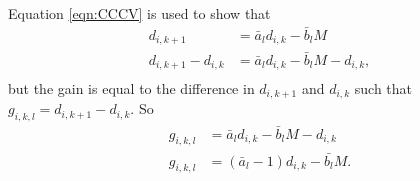 Equation \eqref{eqn:CCCV} is used to show that
\begin{equation}\label{eqn:g}
\begin{aligned}
	d_{i,k+1} &= \bar{a}_ld_{i,k} - \bar{b}_lM \\ 
	d_{i,k+1} - d_{i,k} &= \bar{a}_ld_{i,k} - \bar{b}_lM - d_{i,k},\\
\end{aligned}
\end{equation}
but the gain is equal to the difference in $d_{i,k+1}$ and $d_{i,k}$ such that $g_{i,k,l} = d_{i,k+1} - d_{i,k}$.  So
\begin{equation}\label{eqn:CCCVFinal}
\begin{aligned}
	g_{i,k,l}  &= \bar{a}_ld_{i,k} - \bar{b}_lM - d_{i,k}\\
	g_{i,k,l}  &= (\bar{a}_l - 1)d_{i,k} - \bar{b_l}M.\\
\end{aligned}
\end{equation}

